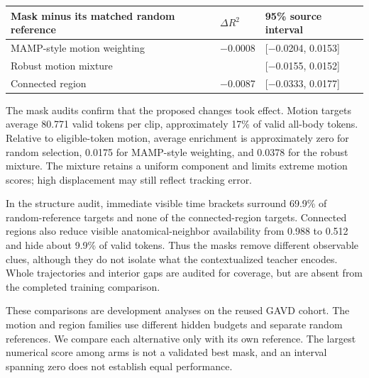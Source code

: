 \documentclass{article}
\begin{document}
\begin{table}[htbp]
\centering
\small
\begin{tabular}{@{}
  >{\raggedright\arraybackslash}p{}
  >{\raggedleft\arraybackslash}p{}
  >{\raggedright\arraybackslash}p{}@{}}
\toprule\noalign{}
\begin{minipage}[b]{\linewidth}\raggedright
Mask minus its matched random reference
\end{minipage} & \begin{minipage}[b]{\linewidth}\raggedleft
\(\Delta R^2\)
\end{minipage} & \begin{minipage}[b]{\linewidth}\raggedright
95\% source interval
\end{minipage} \\
\midrule\noalign{}

MAMP-style motion weighting & −0.0008 & {[}−0.0204, 0.0153{]} \\
Robust motion mixture & 0.0005 & {[}−0.0155, 0.0152{]} \\
Connected region & −0.0087 & {[}−0.0333, 0.0177{]} \\
\bottomrule
\end{tabular}
\end{table}

The mask audits confirm that the proposed changes took effect. Motion targets average 80.771 valid tokens per clip, approximately 17\% of valid all-body tokens. Relative to eligible-token motion, average enrichment is approximately zero for random selection, 0.0175 for MAMP-style weighting, and 0.0378 for the robust mixture. The mixture retains a uniform component and limits extreme motion scores; high displacement may still reflect tracking error.

In the structure audit, immediate visible time brackets surround 69.9\% of random-reference targets and none of the connected-region targets. Connected regions also reduce visible anatomical-neighbor availability from 0.988 to 0.512 and hide about 9.9\% of valid tokens. Thus the masks remove different observable clues, although they do not isolate what the contextualized teacher encodes. Whole trajectories and interior gaps are audited for coverage, but are absent from the completed training comparison.

These comparisons are development analyses on the reused GAVD cohort. The motion and region families use different hidden budgets and separate random references. We compare each alternative only with its own reference. The largest numerical score among arms is not a validated best mask, and an interval spanning zero does not establish equal performance.
\end{document}
